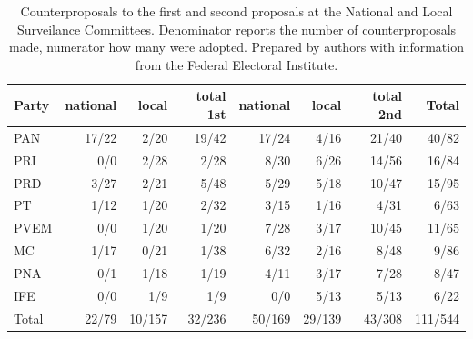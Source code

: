 \documentclass[letter,12pt]{article}
\begin{document}
 
\begin{table}
\begin{center}
  \begin{tabular}{lrrr|rrr|r}
    Party & national & local & total 1st & national & local & total 2nd & Total \\ \hline
    PAN	  & 17/22 & 2/20 & 19/42 & 17/24 & 4/16 & 21/40 & 40/82 \\
    PRI	  & 0/0 & 2/28 & 2/28 & 8/30 & 6/26 & 14/56 & 16/84 \\
    PRD	  & 3/27 & 2/21 & 5/48 & 5/29 & 5/18 & 10/47 & 15/95 \\
    PT	  & 1/12 & 1/20 & 2/32 & 3/15 & 1/16 & 4/31 & 6/63 \\
    PVEM  & 0/0 & 1/20 & 1/20 & 7/28 & 3/17 & 10/45 & 11/65 \\
    MC    & 1/17 & 0/21 & 1/38 & 6/32 & 2/16 & 8/48 & 9/86 \\
    PNA   & 0/1 & 1/18 & 1/19 & 4/11 & 3/17 & 7/28 & 8/47 \\
    IFE   & 0/0 & 1/9 & 1/9 & 0/0 & 5/13 & 5/13 & 6/22 \\ \hline
    Total & 22/79 & 10/157 & 32/236 & 50/169 & 29/139 & 43/308 & 111/544 \\
  \end{tabular}
  \caption{Counterproposals to the first and second proposals at the National and Local Surveilance Committees. Denominator reports the number of counterproposals made, numerator how many were adopted. Prepared by authors with information from the Federal Electoral Institute.}\label{T:counterprops}
\end{center}
\end{table}
 
\end{document}
